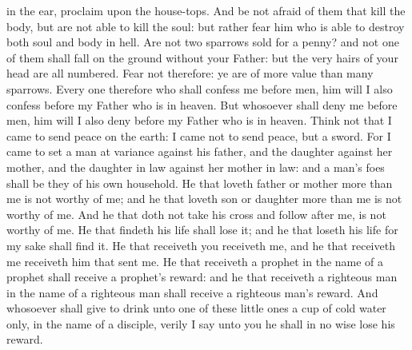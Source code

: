 in the ear, proclaim upon the house-tops. And be not afraid of them that kill the body, but are not able to kill the soul: but rather fear him who is able to destroy both soul and body in hell. Are not two sparrows sold for a penny? and not one of them shall fall on the ground without your Father: but the very hairs of your head are all numbered. Fear not therefore: ye are of more value than many sparrows. Every one therefore who shall confess me before men, him will I also confess before my Father who is in heaven. But whosoever shall deny me before men, him will I also deny before my Father who is in heaven.  Think not that I came to send peace on the earth: I came not to send peace, but a sword. For I came to set a man at variance against his father, and the daughter against her mother, and the daughter in law against her mother in law: and a man’s foes shall be they of his own household. He that loveth father or mother more than me is not worthy of me; and he that loveth son or daughter more than me is not worthy of me. And he that doth not take his cross and follow after me, is not worthy of me. He that findeth his life shall lose it; and he that loseth his life for my sake shall find it.  He that receiveth you receiveth me, and he that receiveth me receiveth him that sent me. He that receiveth a prophet in the name of a prophet shall receive a prophet’s reward: and he that receiveth a righteous man in the name of a righteous man shall receive a righteous man’s reward. And whosoever shall give to drink unto one of these little ones a cup of cold water only, in the name of a disciple, verily I say unto you he shall in no wise lose his reward. 

